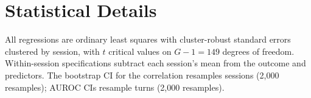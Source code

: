 \documentclass[11pt,a4paper]{article}
\begin{document}
\section{Statistical Details}
All regressions are ordinary least squares with cluster-robust standard errors clustered by session, with $t$
critical values on $G-1=149$ degrees of freedom. Within-session specifications subtract each session's mean from
the outcome and predictors. The bootstrap CI for the correlation resamples sessions (2,000 resamples); AUROC
CIs resample turns (2,000 resamples).
\end{document}
